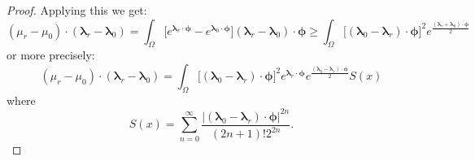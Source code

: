 \documentclass{article}
\def\vc#1{\mathbf{\boldsymbol{#1}}}     %
\def\tn#1{\boldsymbol{#1}}
\def\R{\mathbf{R}}
\def\vl{{\vc\lambda}}
\def\estvl{{\vc{\hat\lambda}}}
\def\vmu{\vc\mu}
\def\estvmu{{\vc{\hat\mu}}}
\def\vphi{\vc\phi}
\begin{document}
\begin{proof}
 
 
 


% 
% 
%  
% 
% 
% 
% 
%  
% 
%  
 
% 


Applying this we get:
\[
  (\mu_r - \mu_0) \cdot (\vl_r - \vl_0) =
  \int_\Omega \Big[ e^{\vl_r\cdot\vphi} - e^{\vl_0\cdot\vphi} \Big] (\vl_r - \vl_0) \cdot \vphi 
  \ge \int_\Omega  \big[ (\vl_0 - \vl_r) \cdot \vphi \big]^2 e^\frac{(\vl_r + \vl_0) \cdot \vphi}{2}
\]
or more precisely:
\[
  (\mu_r - \mu_0) \cdot (\vl_r - \vl_0) =
  \int_\Omega  \big[ (\vl_0 - \vl_r) \cdot \vphi \big]^2 e^{\vl_r\cdot\vphi} e^\frac{(\vl_0 - \vl_r) \cdot \vphi}{2} S(x)
\]
where
\[
  S(x) = \sum_{n=0}^\infty \frac{|(\vl_0 - \vl_r) \cdot \vphi|^{2n}}{(2n+1)!2^{2n}}.
\]






\end{proof}
\end{document}
